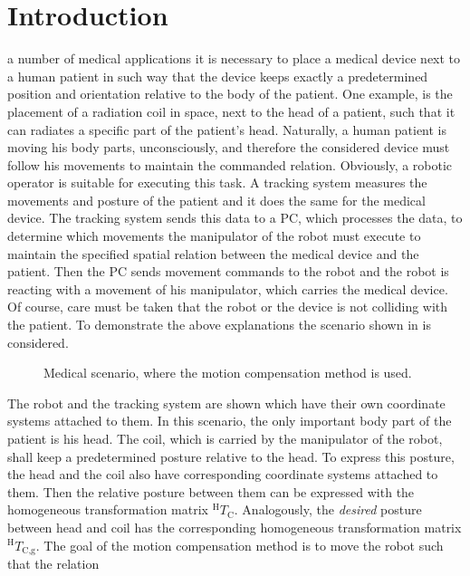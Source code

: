 \section{Introduction}
% 
% 
% 
% 
 a number of medical applications it is necessary to place a medical device 
next to a human patient in such way that the device keeps exactly a predetermined position and 
orientation relative to the body of the patient. One example, is the placement of a radiation 
coil in space, next to the head of a patient, such that it can radiates a specific part of 
the patient's head. Naturally, a human patient is moving his body parts, unconsciously, and 
therefore the considered device must follow his movements to maintain the commanded relation. 
Obviously, a robotic operator is suitable for executing this task. A tracking system measures 
the movements and posture of the patient and it does the same for the medical device. The 
tracking system sends this data to a PC, which processes the data, to determine which 
movements the manipulator of the robot must execute to maintain the specified spatial relation 
between the medical device and the patient. Then the PC sends movement commands to the robot 
and the robot is reacting with a movement of his manipulator, which carries the medical 
device. Of course, care must be taken that the robot or the device is not colliding with the 
patient. To demonstrate the above explanations the scenario shown in  is considered. 
\begin{figure}
\centering

\caption{Medical scenario, where the motion compensation method is used.}
\label{fig:scenario}
\end{figure}
The robot and the tracking system are shown which have their own coordinate systems attached to them. In this scenario, the only important body part of the patient is his head. The coil, which is carried by the manipulator of the robot, shall keep a predetermined posture relative to the head. To express this posture, the head and the coil also have corresponding coordinate systems attached to them. Then the relative posture between them can be expressed with the homogeneous transformation matrix $^{\text{H}}T_{\text{C}}$. Analogously, the \textit{desired} posture between head and coil has the corresponding homogeneous transformation matrix $^{\text{H}}T_{\text{C,g}}$. The goal of the motion compensation method is to move the robot such that the relation
